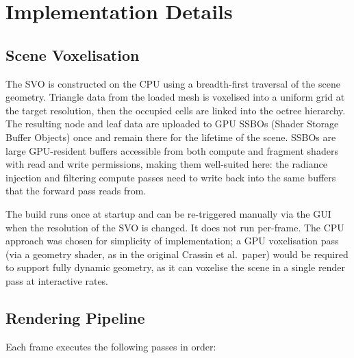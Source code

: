 \documentclass[12pt]{article}
\begin{document}
\section{Implementation Details}

\subsection{Scene Voxelisation}

The SVO is constructed on the CPU using a breadth-first traversal of the scene geometry. Triangle data from the loaded mesh is voxelised into a uniform grid at the target resolution, then the occupied cells are linked into the octree hierarchy. The resulting node and leaf data are uploaded to GPU SSBOs (Shader Storage Buffer Objects) once and remain there for the lifetime of the scene. SSBOs are large GPU-resident buffers accessible from both compute and fragment shaders with read and write permissions, making them well-suited here: the radiance injection and filtering compute passes need to write back into the same buffers that the forward pass reads from.

The build runs once at startup and can be re-triggered manually via the GUI when the resolution of the SVO is changed. It does not run per-frame. The CPU approach was chosen for simplicity of implementation; a GPU voxelisation pass (via a geometry shader, as in the original Crassin et al.\ paper) would be required to support fully dynamic geometry, as it can voxelise the scene in a single render pass at interactive rates.

\subsection{Rendering Pipeline}

Each frame executes the following passes in order:
\end{document}
